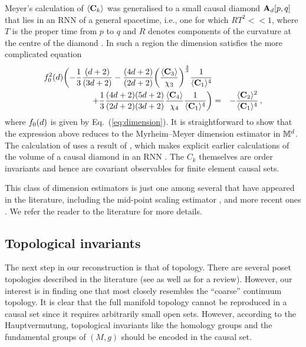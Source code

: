 Meyer's calculation of $\langle {\mathbf C_k} \rangle$ was   generalised to a small causal diamond $\mathbf A_d[p,q]$ that lies in an  RNN of a general 
spacetime, i.e., one for which $RT^2 << 1$, where  $T$ is the proper time from $p$ to $q$ and $R$ denotes components of
the curvature  at the centre of the
diamond  \citep{rss}. In such a region the dimension  satisfies the more complicated equation 
\begin{eqnarray} 
{ f}_0^2(d) \biggl( -\frac{1}{3} \frac{(d+2)}{(3d+2)} -
\frac{(4d+2)}{(2d+2)}\biggl(\frac{\langle {\mathbf C_3} \rangle}{\chi_3}\biggr) ^{\frac{4}{3}} \frac{1}{\langle {\mathbf C_1} \rangle^4}  &&  \nonumber \\ 
+ \frac{1}{3} \frac{(4d+2)(5d+2)}{(2d+2)(3d+2)} \frac{\langle {\mathbf C_4} \rangle}{\chi_4} \frac{1}{\langle {\mathbf C_1} \rangle^4} \biggr)
&=&- \frac{\langle {\mathbf C_2} \rangle^2}{\langle {\mathbf C_1} \rangle^4} \,,
\end{eqnarray} 
where ${ f}_0(d)$ is given by Eq.~(\ref{eq:dimension}). It is straightforward to show that the expression above reduces to the Myrheim--Meyer dimension
estimator in $\mathbb M^d$.  The calculation of \cite{rss} uses a  result of \cite{ks}, which makes explicit
earlier calculations of the volume of a causal diamond in an RNN \citep{myrheim,gs}. 
The $C_k$ themselves
are order invariants and hence are covariant observables for finite element causal sets.


This class of dimension estimators is just one among several that have appeared in the literature, including the {mid-point scaling estimator} \citep{bomthesis,reid}, and more
recent ones \citep{intervals,bomemad}. We refer the reader to the literature for more details. 

\subsection{Topological invariants}
\label{ssec:topology} 
 
The next step in our reconstruction is that of topology.  There are several poset topologies described in the
literature (see \citealt{stanley} as well as  \citealt{suryatop} for a review). However, our interest is in finding one that most closely resembles the ``coarse'' continuum topology. It is clear that the full manifold topology cannot be reproduced in a causal set since it
requires arbitrarily small open sets. However, according to the Hauptvermutung,  topological invariants like the homology groups and the fundamental
groups of $(M,g)$ should be encoded in the causal set. 

